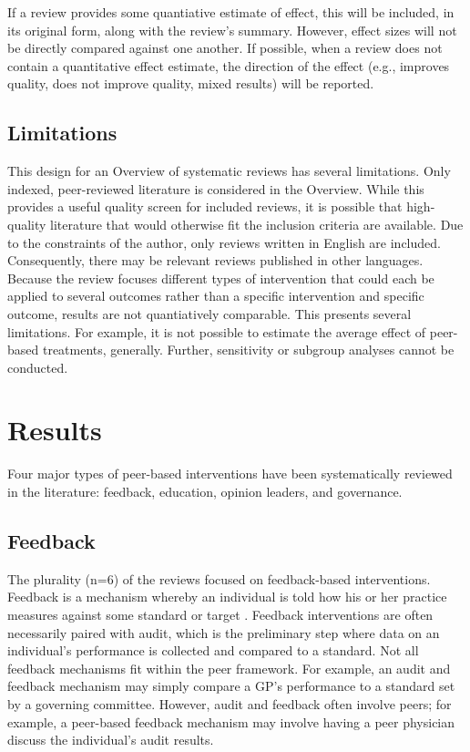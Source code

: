 \documentclass[12pt]{article}
\begin{document}
If a review provides some quantiative estimate of effect, this will be included, in its original form, along with the review's summary. However, effect sizes will not be directly compared against one another. If possible, when a review does not contain a quantitative effect estimate, the direction of the effect (e.g., improves quality, does not improve quality, mixed results) will be reported.

\subsection{Limitations}

This design for an Overview of systematic reviews has several limitations. Only indexed, peer-reviewed literature is considered in the Overview. While this provides a useful quality screen for included reviews, it is possible that high-quality literature that would otherwise fit the inclusion criteria are available. Due to the constraints of the author, only reviews written in English are included. Consequently, there may be relevant reviews published in other languages. Because the review focuses different types of intervention that could each be applied to several outcomes rather than a specific intervention and specific outcome, results are not quantiatively comparable. This presents several limitations. For example, it is not possible to estimate the average effect of peer-based treatments, generally. Further, sensitivity or subgroup analyses cannot be conducted.


\section{Results}

Four major types of peer-based interventions have been systematically reviewed in the literature: feedback, education, opinion leaders, and governance.

\subsection{Feedback}
The plurality (n=6) of the reviews focused on feedback-based interventions. Feedback is a mechanism whereby an individual is told how his or her practice measures against some standard or target \citep{iversAuditFeedbackEffects2012}. Feedback interventions are often necessarily paired with audit, which is the preliminary step where data on an individual's performance is collected and compared to a standard. Not all feedback mechanisms fit within the peer framework. For example, an audit and feedback mechanism may simply compare a GP's performance to a standard set by a governing committee. However, audit and feedback often involve peers; for example, a peer-based feedback mechanism may involve having a peer physician discuss the individual's audit results.
\end{document}
